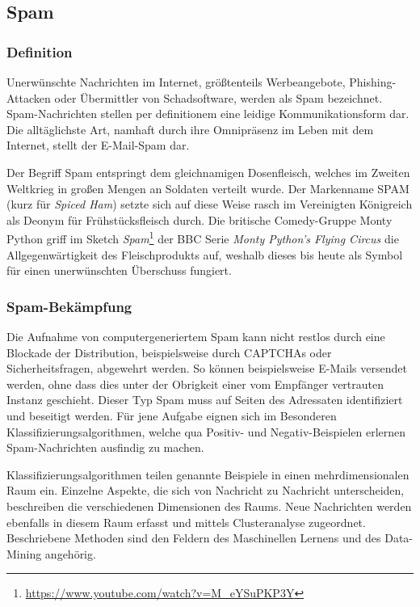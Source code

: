 \subsection{Spam} %
\label{sub:spam}
\subsubsection{Definition} %
\label{ssub:definition}
Unerwünschte Nachrichten im Internet, größtenteils Werbeangebote, Phishing-Attacken oder Übermittler von Schadsoftware, werden als Spam bezeichnet. Spam-Nachrichten stellen per definitionem eine leidige Kommunikationsform dar. Die alltäglichste Art, namhaft durch ihre Omnipräsenz im Leben mit dem Internet, stellt der E-Mail-Spam dar.

Der Begriff Spam entspringt dem gleichnamigen Dosenfleisch, welches im Zweiten Weltkrieg in großen Mengen an Soldaten verteilt wurde. Der Markenname SPAM (kurz für \emph{Spiced Ham}) setzte sich auf diese Weise rasch im Vereinigten Königreich als Deonym für Frühstücksfleisch durch. Die britische Comedy-Gruppe Monty Python griff im Sketch \emph{Spam}\footnote{\url{https://www.youtube.com/watch?v=M_eYSuPKP3Y}} der BBC Serie \emph{Monty Python’s Flying Circus} die Allgegenwärtigkeit des Fleischprodukts auf, weshalb dieses bis heute als Symbol für einen unerwünschten Überschuss fungiert.

\subsubsection{Spam-Bekämpfung} %
\label{ssub:spam_bekampfung}
Die Aufnahme von computergeneriertem Spam kann nicht restlos durch eine Blockade der Distribution, beispielsweise durch CAPTCHAs oder Sicherheitsfragen, abgewehrt werden. So können beispielsweise E-Mails versendet werden, ohne dass dies unter der Obrigkeit einer vom Empfänger vertrauten Instanz geschieht. Dieser Typ Spam muss auf Seiten des Adressaten identifiziert und beseitigt werden. Für jene Aufgabe eignen sich im Besonderen Klassifizierungsalgorithmen, welche qua Positiv- und Negativ-Beispielen erlernen Spam-Nachrichten ausfindig zu machen.

Klassifizierungsalgorithmen teilen genannte Beispiele in einen mehrdimensionalen Raum ein. Einzelne Aspekte, die sich von Nachricht zu Nachricht unterscheiden, beschreiben die verschiedenen Dimensionen des Raums. Neue Nachrichten werden ebenfalls in diesem Raum erfasst und mittels Clusteranalyse zugeordnet. Beschriebene Methoden sind den Feldern des Maschinellen Lernens und des Data-Mining angehörig.
